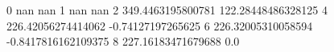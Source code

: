 0 nan nan
1 nan nan
2 349.4463195800781 122.28448486328125
4 226.42056274414062 -0.74127197265625
6 226.32005310058594 -0.8417816162109375
8 227.16183471679688 0.0
